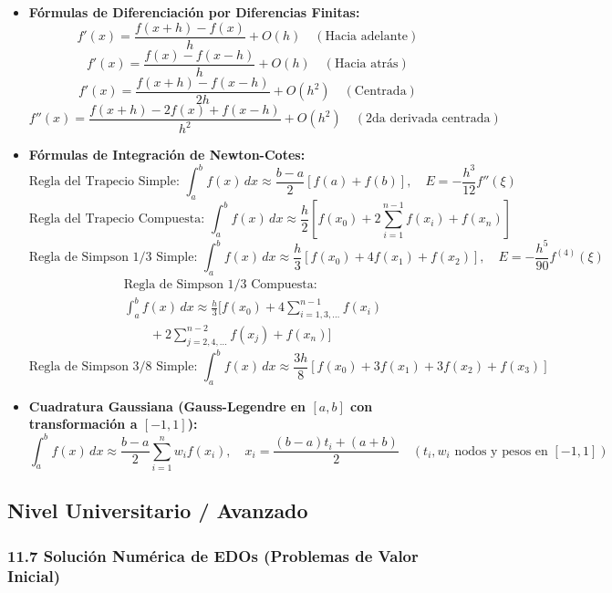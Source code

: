 \documentclass[11pt,a4paper]{article}
\begin{document}
\begin{itemize}
  \item \textbf{Fórmulas de Diferenciación por Diferencias Finitas:}
  \[
    f'(x) = \frac{f(x + h) - f(x)}{h} + O(h) \quad (\text{Hacia adelante})
  \]
  \[
    f'(x) = \frac{f(x) - f(x - h)}{h} + O(h) \quad (\text{Hacia atrás})
  \]
  \[
    f'(x) = \frac{f(x + h) - f(x - h)}{2h} + O(h^2) \quad (\text{Centrada})
  \]
  \[
    f''(x) = \frac{f(x + h) - 2f(x) + f(x - h)}{h^2} + O(h^2) \quad (\text{2da derivada centrada})
  \]
  \item \textbf{Fórmulas de Integración de Newton-Cotes:}
  \[
    \text{Regla del Trapecio Simple: } \int_a^b f(x) \, dx \approx \frac{b - a}{2}[f(a) + f(b)], \quad E = -\frac{h^3}{12}f''(\xi)
  \]
  \[
    \text{Regla del Trapecio Compuesta: } \int_a^b f(x) \, dx \approx \frac{h}{2}\left[ f(x_0) + 2\sum_{i=1}^{n-1} f(x_i) + f(x_n) \right]
  \]
  \[
    \text{Regla de Simpson } 1/3 \text{ Simple: } \int_a^b f(x) \, dx \approx \frac{h}{3}[f(x_0) + 4f(x_1) + f(x_2)], \quad E = -\frac{h^5}{90}f^{(4)}(\xi)
  \]
  \[
    \begin{aligned}
      &\text{Regla de Simpson } 1/3 \text{ Compuesta:} \\
      &\int_a^b f(x) \, dx \approx \frac{h}{3}[f(x_0) + 4\sum_{i=1,3,\dots}^{n-1} f(x_i) \\
      &\qquad + 2\sum_{j=2,4,\dots}^{n-2} f(x_j) + f(x_n)]
    \end{aligned}
  \]
  \[
    \text{Regla de Simpson } 3/8 \text{ Simple: } \int_a^b f(x) \, dx \approx \frac{3h}{8}[f(x_0) + 3f(x_1) + 3f(x_2) + f(x_3)]
  \]
  \item \textbf{Cuadratura Gaussiana (Gauss-Legendre en $[a, b]$ con transformación a $[-1, 1]$):}
  \[
    \int_a^b f(x) \, dx \approx \frac{b - a}{2} \sum_{i=1}^n w_i f(x_i), \quad x_i = \frac{(b - a)t_i + (a + b)}{2} \quad (t_i, w_i \text{ nodos y pesos en } [-1, 1])
  \]
\end{itemize}

\subsection*{Nivel Universitario / Avanzado}

\subsubsection*{11.7 Solución Numérica de EDOs (Problemas de Valor Inicial)}
\end{document}
